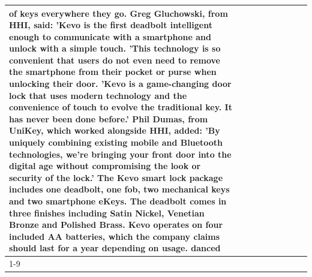 \begin{table}[H]
\begin{tabular}{lllrlllll}
of keys everywhere they go. Greg Gluchowski, from HHI, said: 'Kevo is the first deadbolt intelligent enough to communicate with a smartphone and unlock with a simple touch. 'This technology is so convenient that users do not even need to remove the smartphone from their pocket or purse when unlocking their door. 'Kevo is a game-changing door lock that uses modern technology and the convenience of touch to evolve the traditional key. It has never been done before.' Phil Dumas, from UniKey, which worked alongside HHI, added: 'By uniquely combining existing mobile and Bluetooth technologies, we’re bringing your front door into the digital age without compromising the look or security of the lock.' The Kevo smart lock package includes one deadbolt, one fob, two mechanical keys and two smartphone eKeys. The deadbolt comes in three finishes including Satin Nickel, Venetian Bronze and Polished Brass. Kevo operates on four included AA batteries, which the company claims should last for a year depending on usage. danced \\
\cline{1-9}

\end{tabular}
\end{table}
